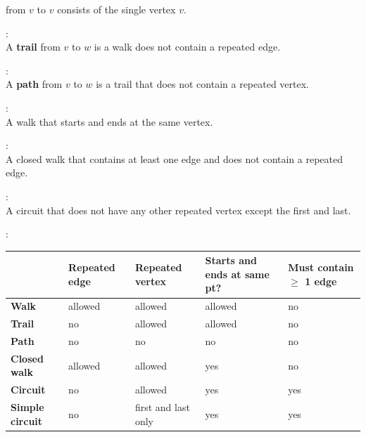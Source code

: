 \documentclass[10pt,landscape,a4paper]{article}
\newenvironment{descitemize} %
{\begin{description}[leftmargin=*,before=\let\makelabel\descitemlabel]}
{\end{description}}
\newcommand{\descitemlabel}[1]{%
\textbullet\ \textbf{#1}%
}
\begin{document}
\begin{multicols*}{4}
\begin{descitemize}
    \item [Trivial Walk] from $v$ to $v$ consists of the single vertex $v$.

    \item [Trail]:\\
    A \textbf{trail} from $v$ to $w$ is a walk does not contain a repeated edge.

    \item [Path]:\\
    A \textbf{path} from $v$ to $w$ is a trail that does not contain a repeated vertex.

    \item [Closed Walk]:\\
    A walk that starts and ends at the same vertex.

    \item [Circuit (Cycle)]:\\
    A closed walk that contains at least one edge and does not contain a repeated edge.

    \item [Simple Circuit]:\\
    A circuit that does not have any other repeated vertex except the first and last.

    \item [Summary]:\\
    \begin{tabularx}{\columnwidth}{|X|X|X|X|X|}
      \hline
                              & Repeated edge & Repeated vertex     & Starts and ends at same pt? & Must contain $\geq$ 1 edge \\ \hline
      \textbf{Walk}           & allowed       & allowed             & allowed                     & no                         \\ \hline
      \textbf{Trail}          & no            & allowed             & allowed                     & no                         \\ \hline
      \textbf{Path}           & no            & no                  & no                          & no                         \\ \hline
      \textbf{Closed walk}    & allowed       & allowed             & yes                         & no                         \\ \hline
      \textbf{Circuit}        & no            & allowed             & yes                         & yes                        \\ \hline
      \textbf{Simple circuit} & no            & first and last only & yes                         & yes                        \\ \hline
    \end{tabularx}


\end{descitemize}
\end{multicols*}
\end{document}
